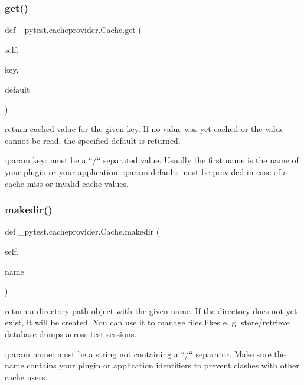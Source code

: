 \subsubsection{\texorpdfstring{get()}{get()}}
{\footnotesize\ttfamily def \+\_\+pytest.\+cacheprovider.\+Cache.\+get (\begin{DoxyParamCaption}\item[{}]{self,  }\item[{}]{key,  }\item[{}]{default }\end{DoxyParamCaption})}

\begin{DoxyVerb}return cached value for the given key.  If no value
was yet cached or the value cannot be read, the specified
default is returned.

:param key: must be a ``/`` separated value. Usually the first
     name is the name of your plugin or your application.
:param default: must be provided in case of a cache-miss or
     invalid cache values.\end{DoxyVerb}
 \mbox{\label{class__pytest_1_1cacheprovider_1_1_cache_a127fc1232969fda6de872312d8520059}} 
\subsubsection{\texorpdfstring{makedir()}{makedir()}}
{\footnotesize\ttfamily def \+\_\+pytest.\+cacheprovider.\+Cache.\+makedir (\begin{DoxyParamCaption}\item[{}]{self,  }\item[{}]{name }\end{DoxyParamCaption})}

\begin{DoxyVerb}return a directory path object with the given name.  If the
directory does not yet exist, it will be created.  You can use it
to manage files likes e. g. store/retrieve database
dumps across test sessions.

:param name: must be a string not containing a ``/`` separator.
     Make sure the name contains your plugin or application
     identifiers to prevent clashes with other cache users.
\end{DoxyVerb}
 \mbox{\label{class__pytest_1_1cacheprovider_1_1_cache_a5ae178e79e86425ce2c56dfcf96bbf3b}} 
